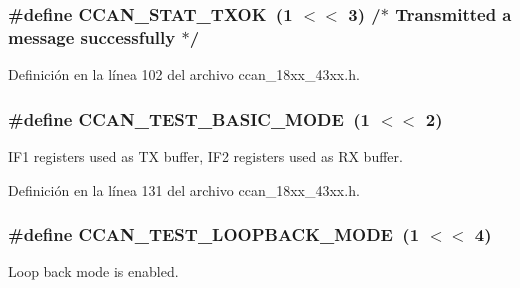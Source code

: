 \subsubsection[{\texorpdfstring{C\+C\+A\+N\+\_\+\+S\+T\+A\+T\+\_\+\+T\+X\+OK}{CCAN_STAT_TXOK}}]{\setlength{\rightskip}{0pt plus 5cm}\#define C\+C\+A\+N\+\_\+\+S\+T\+A\+T\+\_\+\+T\+X\+OK~(1 $<$$<$ 3)	/$\ast$ Transmitted a message successfully $\ast$/}\hypertarget{group___c_c_a_n__18_x_x__43_x_x_ga89b5bd7c2e8a0593d1d4b325e1d04a2f}{}\label{group___c_c_a_n__18_x_x__43_x_x_ga89b5bd7c2e8a0593d1d4b325e1d04a2f}


Definición en la línea 102 del archivo ccan\+\_\+18xx\+\_\+43xx.\+h.

\subsubsection[{\texorpdfstring{C\+C\+A\+N\+\_\+\+T\+E\+S\+T\+\_\+\+B\+A\+S\+I\+C\+\_\+\+M\+O\+DE}{CCAN_TEST_BASIC_MODE}}]{\setlength{\rightskip}{0pt plus 5cm}\#define C\+C\+A\+N\+\_\+\+T\+E\+S\+T\+\_\+\+B\+A\+S\+I\+C\+\_\+\+M\+O\+DE~(1 $<$$<$ 2)}\hypertarget{group___c_c_a_n__18_x_x__43_x_x_ga5b82b859cbcbfbea3ee778cfdcde0e85}{}\label{group___c_c_a_n__18_x_x__43_x_x_ga5b82b859cbcbfbea3ee778cfdcde0e85}
I\+F1 registers used as TX buffer, I\+F2 registers used as RX buffer. 

Definición en la línea 131 del archivo ccan\+\_\+18xx\+\_\+43xx.\+h.

\subsubsection[{\texorpdfstring{C\+C\+A\+N\+\_\+\+T\+E\+S\+T\+\_\+\+L\+O\+O\+P\+B\+A\+C\+K\+\_\+\+M\+O\+DE}{CCAN_TEST_LOOPBACK_MODE}}]{\setlength{\rightskip}{0pt plus 5cm}\#define C\+C\+A\+N\+\_\+\+T\+E\+S\+T\+\_\+\+L\+O\+O\+P\+B\+A\+C\+K\+\_\+\+M\+O\+DE~(1 $<$$<$ 4)}\hypertarget{group___c_c_a_n__18_x_x__43_x_x_ga9ee2a6a2c209e479ef82adb269ac3919}{}\label{group___c_c_a_n__18_x_x__43_x_x_ga9ee2a6a2c209e479ef82adb269ac3919}
Loop back mode is enabled. 

